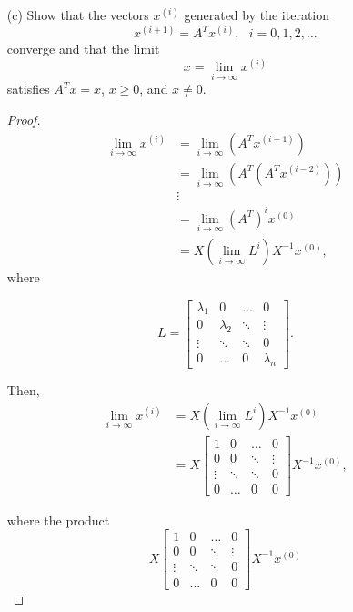 \documentclass[12pt]{article}
\begin{document}
\begin{itemize}
\begin{itemize}
\begin{proof}
\end{proof}

\end{itemize}

\item[(c)] Show that the vectors $x^{(i)}$ generated by the iteration
$$x^{(i+1)} = A^T x^{(i)}, \text{ } i=0,1,2, \dots $$
converge and that the limit
$$x = \lim_{i \rightarrow \infty} x^{(i)}$$
satisfies $A^T x = x$, $x \geq 0$, and $x \neq 0$.

\begin{proof} $\text{ }$ \\

\begin{align}
\lim_{i \rightarrow \infty} x^{(i)} &= \lim_{i \rightarrow \infty} 		\left(A^T x^{(i-1)}\right) \nonumber \\
&= \lim_{i \rightarrow \infty} \left(A^T\left(A^T x^{(i-2)}\right)		\right) \nonumber \\
& \vdots \nonumber \\
&= \lim_{i \rightarrow \infty} \left(A^T\right)^i x^{(0)} \nonumber 		\\
&= X\left(\lim_{i \rightarrow \infty} L^i \right) X^{-1} x^{(0)}, 		\nonumber
\end{align}
where

$$L = \begin{bmatrix}
		\lambda_1 & 0 & \hdots & 0 \\
		0 & \lambda_2 & \ddots & \vdots \\
		\vdots & \ddots & \ddots & 0 \\
		0 & \hdots & 0 & \lambda_n
		\end{bmatrix}. $$

Then,
\begin{align}
\lim_{i \rightarrow \infty} x^{(i)} &= X\left(\lim_{i \rightarrow 		\infty} L^i \right) X^{-1} x^{(0)} \nonumber \\
&= X \begin{bmatrix}
	1 & 0 & \hdots & 0 \\
	0 & 0 & \ddots & \vdots \\
	\vdots & \ddots & \ddots & 0 \\
	0 & \hdots & 0 & 0
	\end{bmatrix} X^{-1} x^{(0)}, \nonumber
\end{align}

where the product
$$X \begin{bmatrix}
	1 & 0 & \hdots & 0 \\
	0 & 0 & \ddots & \vdots \\
	\vdots & \ddots & \ddots & 0 \\
	0 & \hdots & 0 & 0
	\end{bmatrix} X^{-1} x^{(0)}$$
	

\end{proof}
\end{itemize}
\end{document}
